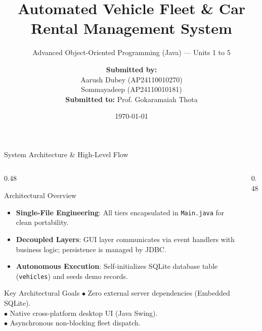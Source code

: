 \documentclass[aspectratio=169,10pt]{beamer}
\title[Fleet \& Car Rental System]{\textbf{Automated Vehicle Fleet \& Car Rental Management System}}
\subtitle{Advanced Object-Oriented Programming (Java) — Units 1 to 5}
\author[Aarush \& Sommayadeep]{
    \textbf{Submitted by:}\\[0.2em]
    Aarush Dubey (AP24110010270)\\[0.2em]
    Sommayadeep (AP24110010181)\\[0.4em]
    \textbf{Submitted to:} Prof. Gokaramaiah Thota
}
\institute[SRM University AP]{Department of Computer Science and Engineering\\SRM University AP}
\date{\today}
\begin{document}
\begin{frame}
    \titlepage
\end{frame}

\begin{frame}{System Architecture \& High-Level Flow}
    \begin{columns}[T]
        \begin{column}{0.48\textwidth}
            \begin{block}{Architectural Overview}
                \small
                \begin{itemize}
                    \item \textbf{Single-File Engineering}: All tiers encapsulated in \texttt{Main.java} for clean portability.
                    \item \textbf{Decoupled Layers}: GUI layer communicates via event handlers with business logic; persistence is managed by JDBC.
                    \item \textbf{Autonomous Execution}: Self-initializes SQLite database table (\texttt{vehicles}) and seeds demo records.
                \end{itemize}
            \end{block}
            \begin{exampleblock}{Key Architectural Goals}
                \small
                $\bullet$ Zero external server dependencies (Embedded SQLite).\\
                $\bullet$ Native cross-platform desktop UI (Java Swing).\\
                $\bullet$ Asynchronous non-blocking fleet dispatch.
            \end{exampleblock}
        \end{column}
        
        \begin{column}{0.48\textwidth}
            \centering
\end{column}
\end{columns}
\end{frame}
\end{document}
